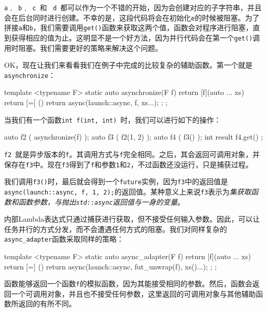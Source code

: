 \texttt{a} , \texttt{ b} , \texttt{ c }和 \texttt{ d }都可以作为一个不错的开始，因为会创建对应的子字符串，并且会在后台同时进行创建。不幸的是，这段代码将会在初始化\texttt{e}的时候被阻塞。为了拼接\texttt{a}和\texttt{b}，我们需要调用\texttt{get()}函数来获取这两个值，函数会对程序进行阻塞，直到获得相应的值为止。这明显不是一个好方法，因为并行代码会在第一个\texttt{get()}调用时阻塞。我们需要更好的策略来解决这个问题。

OK，现在让我们来看看我们在例子中完成的比较复杂的辅助函数。第一个就是\texttt{asynchronize}：

\begin{codebox}[cpp]
template <typename F>
static auto asynchronize(F f)
{
    return [f](auto ... xs) {
        return [=] () {
            return async(launch::async, f, xs...);
        };
    };
}
\end{codebox}

当我们有一个函数\texttt{int f(int, int) }时，我们可以进行如下的操作：

\begin{codebox}[cpp]
auto f2 ( asynchronize(f) );
auto f3 ( f2(1, 2) );
auto f4 ( f3() );
int result { f4.get() };
\end{codebox}

\texttt{f2 }就是异步版本的\texttt{f}。其调用方式与\texttt{f}完全相同。之后，其会返回可调用对象，并保存在\texttt{f3}中。现在\texttt{f3}得到了\texttt{f}和参数\texttt{1}和\texttt{2}，不过函数还没运行，只是捕获过程。

我们调用\texttt{f3()}时，最后就会得到一个\texttt{future}实例，因为\texttt{f3}中的返回值是\texttt{async(launch::async, f, 1, 2);}的返回值。某种意义上来说\texttt{f3}表示为\emph{集获取函数和函数参数，与抛出\texttt{std::async}返回值与一身的变量}。

内部Lambda表达式只通过捕获进行获取，但不接受任何输入参数。因此，可以让任务并行的方式分发，而不会遭遇任何方式的阻塞。我们对同样复杂的\texttt{async\_adapter}函数采取同样的策略：

\begin{codebox}[cpp]
template <typename F>
static auto async_adapter(F f)
{
    return [f](auto ... xs) {
        return [=] () {
            return async(launch::async, fut_unwrap(f), xs()...);
        };
    };
}
\end{codebox}

函数能够返回一个函数\texttt{f}的模拟函数，因为其能接受相同的参数。然后，函数会返回一个可调用对象，并且也不接受任何参数，这里返回的可调用对象与其他辅助函数所返回的有所不同。

